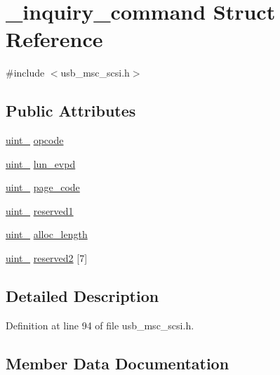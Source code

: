 \hypertarget{struct__inquiry__command}{}\section{\+\_\+inquiry\+\_\+command Struct Reference}
\label{struct__inquiry__command}


{\ttfamily \#include $<$usb\+\_\+msc\+\_\+scsi.\+h$>$}

\subsection*{Public Attributes}
\begin{DoxyCompactItemize}
\item 
\hyperlink{types_8h_ad3209046c23f739a81581c10a4be7d92}{uint\+\_} \hyperlink{struct__inquiry__command_a44513ed917a8099af3b28133d659561b}{opcode}
\item 
\hyperlink{types_8h_ad3209046c23f739a81581c10a4be7d92}{uint\+\_} \hyperlink{struct__inquiry__command_ad65c0358707a50ad63ab612fd9b7299e}{lun\+\_\+evpd}
\item 
\hyperlink{types_8h_ad3209046c23f739a81581c10a4be7d92}{uint\+\_} \hyperlink{struct__inquiry__command_a3bd7a034b3df6c5cfae38b43e7729757}{page\+\_\+code}
\item 
\hyperlink{types_8h_ad3209046c23f739a81581c10a4be7d92}{uint\+\_} \hyperlink{struct__inquiry__command_a53215dd8e2679538d06b1a55ccebb5b8}{reserved1}
\item 
\hyperlink{types_8h_ad3209046c23f739a81581c10a4be7d92}{uint\+\_} \hyperlink{struct__inquiry__command_a77d5640c63d7574db8213256241c7c97}{alloc\+\_\+length}
\item 
\hyperlink{types_8h_ad3209046c23f739a81581c10a4be7d92}{uint\+\_} \hyperlink{struct__inquiry__command_ac4b768c51bf26ebd95b837328c27994f}{reserved2} \mbox{[}7\mbox{]}
\end{DoxyCompactItemize}


\subsection{Detailed Description}


Definition at line 94 of file usb\+\_\+msc\+\_\+scsi.\+h.



\subsection{Member Data Documentation}
